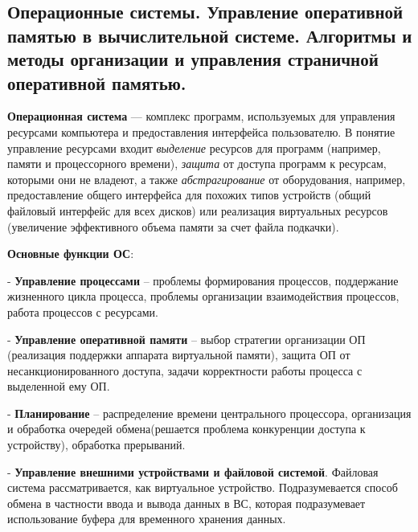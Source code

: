 \subsection{Операционные системы. Управление оперативной памятью в вычислительной системе. Алгоритмы и методы организации и управления страничной оперативной памятью.}

\textbf{Операционная система} --- комплекс программ, используемых для управления ресурсами компьютера и предоставления интерфейса пользователю.
В понятие управление ресурсами входит \textit{выделение} ресурсов для программ (например, памяти и процессорного времени),
\textit{защита} от доступа программ к ресурсам, которыми они не владеют, а также
\textit{абстрагирование} от оборудования, например, предоставление общего интерфейса для похожих типов устройств
(общий файловый интерфейс для всех дисков) или реализация виртуальных ресурсов (увеличение эффективного объема памяти за счет файла подкачки).



\textbf{Основные функции ОС}: 

- \textbf{Управление процессами} -- проблемы формирования процессов, поддержание жизненного цикла процесса, проблемы организации взаимодействия процессов, работа процессов с ресурсами.
    
- \textbf{Управление оперативной памяти} -- выбор стратегии организации ОП (реализация поддержки аппарата виртуальной памяти), защита ОП от несанкционированного доступа, задачи корректности работы процесса с выделенной ему ОП. 

- \textbf{Планирование} -- распределение времени центрального процессора, организация и обработка очередей обмена(решается проблема конкуренции доступа к устройству), обработка прерываний. 

- \textbf{Управление внешними устройствами и файловой системой}. Файловая система рассматривается, как виртуальное устройство. Подразумевается способ обмена в частности ввода и вывода данных в ВС, которая подразумевает использование буфера для временного хранения данных. 

